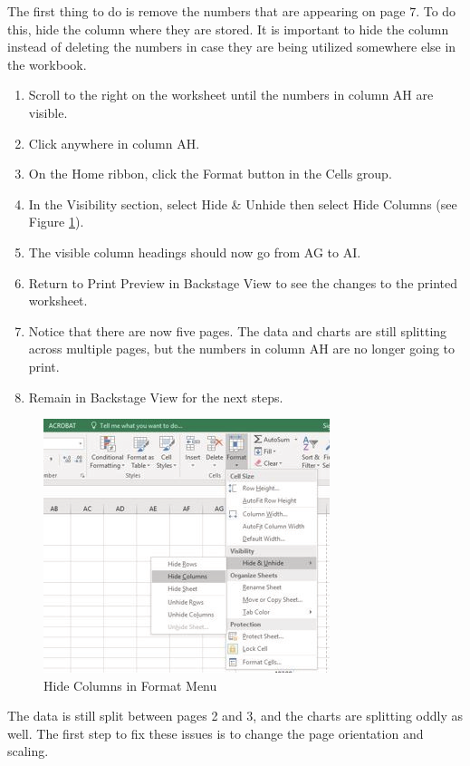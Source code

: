 The first thing to do is remove the numbers that are appearing on page $ 7 $. To do this, hide the column where they are stored. It is important to hide the column instead of deleting the numbers in case they are being utilized somewhere else in the workbook.

\begin{enumerate}
	\item Scroll to the right on the worksheet until the numbers in column AH are visible.
	\item Click anywhere in column AH.
	\item On the Home ribbon, click the Format button in the Cells group.
	\item In the Visibility section, select Hide \& Unhide then select Hide Columns (see Figure \ref{04:fig49}).
	\item The visible column headings should now go from AG to AI.
	\item Return to Print Preview in Backstage View to see the changes to the printed worksheet.
	\item Notice that there are now five pages. The data and charts are still splitting across multiple pages, but the numbers in column AH are no longer going to print.
	\item Remain in Backstage View for the next steps.
\end{enumerate}

\begin{figure}[H]
	\centering
	\includegraphics[width=\maxwidth{.95\linewidth}]{gfx/ch04_fig49}
	\caption{Hide Columns in Format Menu}
	\label{04:fig49}
\end{figure}

The data is still split between pages 2 and 3, and the charts are splitting oddly as well. The first step to fix these issues is to change the page orientation and scaling.


